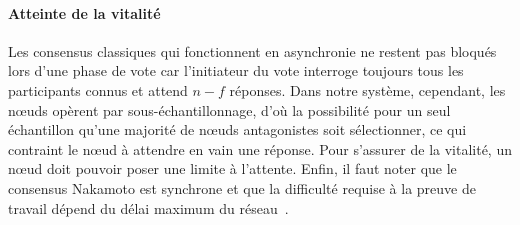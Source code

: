 \documentclass[letterpaper,twocolumn,10pt]{article}
\newcommand{\editinsert}[1]{{\color{blue}#1}}
\theoremstyle{definition}
\begin{document}
\paragraph{Atteinte de la vitalité} %
Les consensus classiques qui fonctionnent en asynchronie ne restent pas bloqués lors d'une phase de vote car l'initiateur du vote interroge toujours tous les participants connus et attend $n - f$ réponses.
Dans notre système, cependant, les nœuds opèrent par sous-échantillonnage, d'où la possibilité pour un seul échantillon qu'une majorité de nœuds antagonistes soit sélectionner, ce qui contraint le nœud à attendre en vain une réponse. Pour s'assurer de la vitalité, un nœud doit pouvoir poser une limite à l'attente. Enfin, il faut noter que le consensus Nakamoto est synchrone et que la difficulté requise à la preuve de travail dépend du délai maximum du réseau~\cite{PassSS17}. 

\end{document}
